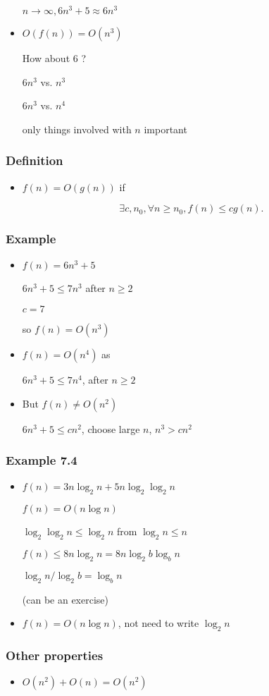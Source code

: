 \begin{frame}[allowframebreaks]
\begin{itemize}
$n \rightarrow \infty, 6n^3 + 5 \approx 6n^3$
\item $O(f(n))=O(n^3)$

How about 6 ?

$6n^3$ vs. $n^3$

$6n^3$ vs. $n^4$

only things involved with $n$ important
\end{itemize}\end{frame} \begin{frame}[allowframebreaks] \frametitle{Definition}
  \begin{itemize}
\item $f(n)=O(g(n))$ if 

  \begin{equation*}
    \exists c, n_0, \forall n \geq n_0,
f(n) \leq c g(n).
  \end{equation*}
\end{itemize}\end{frame} \begin{frame}[allowframebreaks] \frametitle{Example}
    \begin{itemize}
\item $f(n) = 6n^3 + 5$

$6n^3 + 5 \leq 7n^3$ after $n \geq 2$

$c=7$

so $f(n) = O(n^3)$
\item $f(n)=O(n^4)$ as 

$6n^3+5 \leq 7n^4$, after $n \geq 2$
\item But $f(n) \neq O(n^2)$

$6n^3+5 \leq c n^2$, choose large $n$, $n^3 > cn^2$

\end{itemize}\end{frame} \begin{frame}[allowframebreaks] \frametitle{Example 7.4}
  \begin{itemize}
\item $f(n)=3n \log_2 n + 5n \log_2 \log_2 n
$

$f(n) = O(n\log n)$

$\log_2 \log_2 n \leq \log_2 n$
from $\log_2 n \leq n$

$f(n) \leq 8n \log_2 n = 8n\log_2 b\log_b n$

$\log_2 n / \log_2 b= \log_b n$

(can be an exercise)

\item $f(n)=O(n\log n)$, not need to write $\log_2 n$
\end{itemize}\end{frame} \begin{frame}[allowframebreaks] \frametitle{Other properties}
  \begin{itemize}
\item $O(n^2) + O(n) = O(n^2)$


\end{itemize}
\end{frame}
